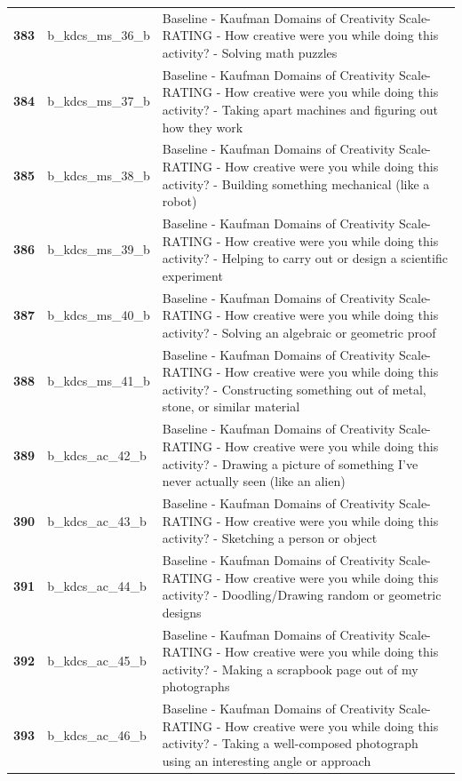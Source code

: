 \documentclass[
  letterpaper,
  DIV=11,
  numbers=noendperiod]{scrartcl}
\begin{document}
\begin{longtable}[t]{>{}cll}
\textbf{383} & b\_kdcs\_ms\_36\_b & Baseline - Kaufman Domains of Creativity Scale-RATING - How creative were you while doing this activity? - Solving math puzzles\\
\textbf{384} & b\_kdcs\_ms\_37\_b & Baseline - Kaufman Domains of Creativity Scale-RATING - How creative were you while doing this activity? - Taking apart machines and figuring out how they work\\
\textbf{385} & b\_kdcs\_ms\_38\_b & Baseline - Kaufman Domains of Creativity Scale-RATING - How creative were you while doing this activity? - Building something mechanical (like a robot)\\
\addlinespace
\textbf{386} & b\_kdcs\_ms\_39\_b & Baseline - Kaufman Domains of Creativity Scale-RATING - How creative were you while doing this activity? - Helping to carry out or design a scientific experiment\\
\textbf{387} & b\_kdcs\_ms\_40\_b & Baseline - Kaufman Domains of Creativity Scale-RATING - How creative were you while doing this activity? - Solving an algebraic or geometric proof\\
\textbf{388} & b\_kdcs\_ms\_41\_b & Baseline - Kaufman Domains of Creativity Scale-RATING - How creative were you while doing this activity? - Constructing something out of metal, stone, or similar material\\
\textbf{389} & b\_kdcs\_ac\_42\_b & Baseline - Kaufman Domains of Creativity Scale-RATING - How creative were you while doing this activity? - Drawing a picture of something I've never actually seen (like an alien)\\
\textbf{390} & b\_kdcs\_ac\_43\_b & Baseline - Kaufman Domains of Creativity Scale-RATING - How creative were you while doing this activity? - Sketching a person or object\\
\addlinespace
\textbf{391} & b\_kdcs\_ac\_44\_b & Baseline - Kaufman Domains of Creativity Scale-RATING - How creative were you while doing this activity? - Doodling/Drawing random or geometric designs\\
\textbf{392} & b\_kdcs\_ac\_45\_b & Baseline - Kaufman Domains of Creativity Scale-RATING - How creative were you while doing this activity? - Making a scrapbook page out of my photographs\\
\textbf{393} & b\_kdcs\_ac\_46\_b & Baseline - Kaufman Domains of Creativity Scale-RATING - How creative were you while doing this activity? - Taking a well-composed photograph using an interesting angle or approach\\

\end{longtable}
\end{document}
